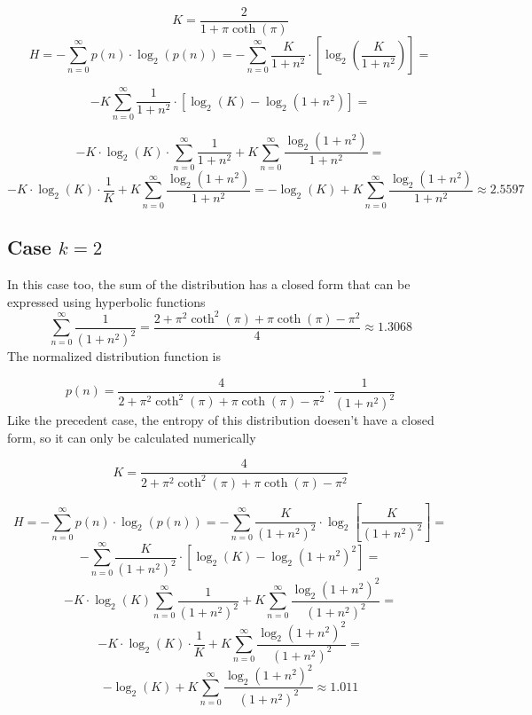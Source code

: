 \[ 
	K = \frac{2}{1 + \pi \coth(\pi)}
\]
\[ 
	H = - \sum_{n=0}^{\infty} p(n) \cdot \log_2(p(n)) =
	-  \sum_{n=0}^{\infty} \frac{K}{1 + n^2} \cdot
	\left[
	\log_2\left(\frac{K}{1 + n^2}\right) 
	\right] = 
\]

\[ 
	- K	\sum_{n=0}^{\infty} \frac{1}{1 + n^2} \cdot
	\left[
	\log_2(K)- \log_2(1 + n^2)
	\right] =
\]

\[ 
	- K \cdot \log_2(K) \cdot 
	\sum_{n=0}^{\infty} \frac{1}{1 + n^2}
	+ K \sum_{n=0}^{\infty}
	\frac{\log_2(1 + n^2)}{1 + n^2} =
\]
\[ 
	- K \cdot \log_2(K) \cdot 
	\frac{1}{K}
	+ K \sum_{n=0}^{\infty}
	\frac{\log_2(1 + n^2)}{1 + n^2} = 
	- \log_2(K)
	+ K \sum_{n=0}^{\infty}
	\frac{\log_2(1 + n^2)}{1 + n^2}
	\approx 2.5597
\]


\subsection{Case $k=2$}
In this case too, the sum of the distribution has a closed form that can be expressed using hyperbolic functions
\[ 
	\sum_{n=0}^{\infty} \frac{1}{(1 + n^2)^2} 
	= \frac{2 + \pi^2 \coth^2(\pi) + \pi \coth(\pi) - \pi^2}
	{4} \approx 1.3068
\]
The normalized distribution function is

\[ 
	p(n) = \frac {4} {2 + \pi^2 \coth^2(\pi) + \pi \coth(\pi) - \pi^2} \cdot
	\frac{1}{(1 + n^2)^2}
\]
Like the precedent case, the entropy of this distribution doesen't have a closed form, so it can only be calculated numerically

\[ 
	K = \frac {4} {2 + \pi^2 \coth^2(\pi) + \pi \coth(\pi) - \pi^2}
\]

\[ 
	H = - \sum_{n=0}^{\infty} p(n) \cdot \log_2(p(n)) =
	- \sum_{n=0}^{\infty} 
	\frac{K}{(1 + n^2)^2} \cdot 
	\log_2 \left[
	\frac{K}{(1 + n^2)^2}
	\right] =
\]
\[ 
	- \sum_{n=0}^{\infty} 
	\frac{K}{(1 + n^2)^2} \cdot
	\left[
		\log_2(K) - \log_2(1 + n^2)^2
	\right] =
\]
\[ 
	- K \cdot \log_2(K) \sum_{n=0}^{\infty}
	\frac{1}{(1 + n^2)^2} +
	K \sum_{n=0}^{\infty}
	\frac{\log_2(1 + n^2)^2}{(1 + n^2)^2} =
\]
\[ 
	- K \cdot \log_2(K) \cdot \frac{1}{K} +
	K \sum_{n=0}^{\infty}
	\frac{\log_2(1 + n^2)^2}{(1 + n^2)^2} =
\]
\[ 
	- \log_2(K) +
	K \sum_{n=0}^{\infty}
	\frac{\log_2(1 + n^2)^2}{(1 + n^2)^2}
	\approx 1.011
\]

